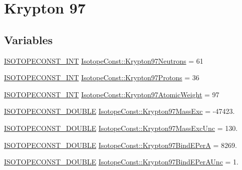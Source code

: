 \hypertarget{group___isotope_const-_krypton-_kr97}{}\section{Krypton 97}
\label{group___isotope_const-_krypton-_kr97}
\subsection*{Variables}
\begin{DoxyCompactItemize}
\item 
\mbox{\hyperlink{group___isotope_const-_macros_ga5f18360b3e99483a35c32d789e62621c}{I\+S\+O\+T\+O\+P\+E\+C\+O\+N\+S\+T\+\_\+\+I\+NT}} \mbox{\hyperlink{group___isotope_const-_krypton-_kr97_gad83d91dca1c352f00979efdca94f20ce}{Isotope\+Const\+::\+Krypton97\+Neutrons}} = 61
\item 
\mbox{\hyperlink{group___isotope_const-_macros_ga5f18360b3e99483a35c32d789e62621c}{I\+S\+O\+T\+O\+P\+E\+C\+O\+N\+S\+T\+\_\+\+I\+NT}} \mbox{\hyperlink{group___isotope_const-_krypton-_kr97_gaf1a4855741ecbda8f91f43e7d4ae4191}{Isotope\+Const\+::\+Krypton97\+Protons}} = 36
\item 
\mbox{\hyperlink{group___isotope_const-_macros_ga5f18360b3e99483a35c32d789e62621c}{I\+S\+O\+T\+O\+P\+E\+C\+O\+N\+S\+T\+\_\+\+I\+NT}} \mbox{\hyperlink{group___isotope_const-_krypton-_kr97_gae768e237fb1cbc2e1e42ca913167f285}{Isotope\+Const\+::\+Krypton97\+Atomic\+Weight}} = 97
\item 
\mbox{\hyperlink{group___isotope_const-_macros_ga8f45a7272ce02c0b4c65c44636ed719a}{I\+S\+O\+T\+O\+P\+E\+C\+O\+N\+S\+T\+\_\+\+D\+O\+U\+B\+LE}} \mbox{\hyperlink{group___isotope_const-_krypton-_kr97_ga5dbb9aad0c439128ced5ca238773a0be}{Isotope\+Const\+::\+Krypton97\+Mass\+Exc}} = -\/47423.
\item 
\mbox{\hyperlink{group___isotope_const-_macros_ga8f45a7272ce02c0b4c65c44636ed719a}{I\+S\+O\+T\+O\+P\+E\+C\+O\+N\+S\+T\+\_\+\+D\+O\+U\+B\+LE}} \mbox{\hyperlink{group___isotope_const-_krypton-_kr97_ga6a24a1c314a9d3b6c996d5f211566871}{Isotope\+Const\+::\+Krypton97\+Mass\+Exc\+Unc}} = 130.
\item 
\mbox{\hyperlink{group___isotope_const-_macros_ga8f45a7272ce02c0b4c65c44636ed719a}{I\+S\+O\+T\+O\+P\+E\+C\+O\+N\+S\+T\+\_\+\+D\+O\+U\+B\+LE}} \mbox{\hyperlink{group___isotope_const-_krypton-_kr97_ga2eb62be172c59f3adab6e31b98d8b506}{Isotope\+Const\+::\+Krypton97\+Bind\+E\+PerA}} = 8269.
\item 
\mbox{\hyperlink{group___isotope_const-_macros_ga8f45a7272ce02c0b4c65c44636ed719a}{I\+S\+O\+T\+O\+P\+E\+C\+O\+N\+S\+T\+\_\+\+D\+O\+U\+B\+LE}} \mbox{\hyperlink{group___isotope_const-_krypton-_kr97_ga2f74cceac338647e6f129e446c7e43c1}{Isotope\+Const\+::\+Krypton97\+Bind\+E\+Per\+A\+Unc}} = 1.

\end{DoxyCompactItemize}
